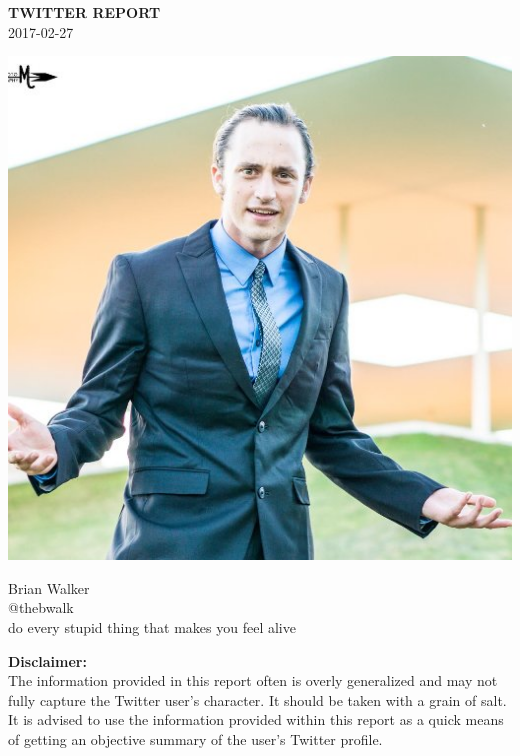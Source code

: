 \documentclass[12pt]{article}
\begin{document}
\vskip 0.6in
\begin{center}
\huge \textbf{TWITTER REPORT}\\
\small 2017-02-27\\
\end{center}
\vskip 1.5in
\begin{minipage}{0.5\textwidth}
\begin{center}
\includegraphics[width=0.8\linewidth]{prof_pic.jpg}
\end{center}
\end{minipage}
\hfill
\begin{minipage}{0.5\textwidth}\huge \noindent Brian Walker\\
\large @thebwalk\\
\large do every stupid thing that makes you feel alive\\
\end{minipage}
\vskip 4.0in
\noindent \textbf{Disclaimer:}\\
\small The information provided in this report often is overly generalized and may not fully capture the Twitter user's character. It should be taken with a grain of salt. It is advised to use the information provided within this report as a quick means of getting an objective summary of the user's Twitter profile.
\newpage
\end{document}
